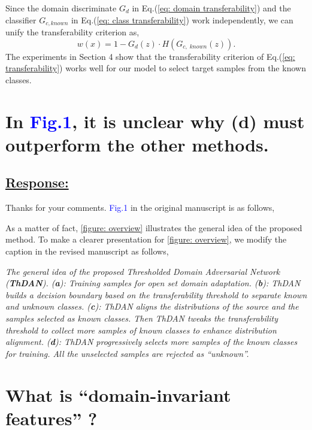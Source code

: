 Since the domain discriminate $G_d$ in Eq.(\ref{eq: domain transferability}) and the classifier $G_{c, known}$ in Eq.(\ref{eq: class transferability}) work independently, we can unify the transferability criterion as,
\begin{equation}
    \label{eq: transferability}
    w(x)=1-G_d(z)\cdot H(G_{c,\; known}(z)).
\end{equation}
The experiments in Section 4 show that the transferability criterion of Eq.(\ref{eq: transferability}) works well for our model to select target samples from the known classes.


\section{In \textcolor{blue}{Fig.1}, it is unclear why (d) must outperform the other methods.}
\subsection*{\underline{\textbf{Response:}}}

Thanks for your comments.
\textcolor{blue}{Fig.1} in the original manuscript is as follows,


As a matter of fact, \figurename{\ref{figure: overview}} illustrates the general idea of the proposed method.
To make a clearer presentation for \figurename{\ref{figure: overview}}, we modify the caption in the revised manuscript as follows,
\begin{siderules}
    \textit{
        \footnotesize
        The general idea of the proposed Thresholded Domain Adversarial Network (\textit{\textbf{ThDAN}}).
        (\textbf{a}): Training samples for open set domain adaptation. 
        (\textbf{b}): ThDAN builds a decision boundary based on the transferability threshold to separate known and unknown classes.
        (\textbf{c}): ThDAN aligns the distributions of the source and the samples selected as known classes. Then ThDAN tweaks the transferability threshold to collect more samples of known classes to enhance distribution alignment.
        (\textbf{d}): ThDAN progressively selects more samples of the known classes for training. All the unselected samples are rejected as ``unknown''.
    }
\end{siderules}


\section{What is ``domain-invariant features'' ?}
